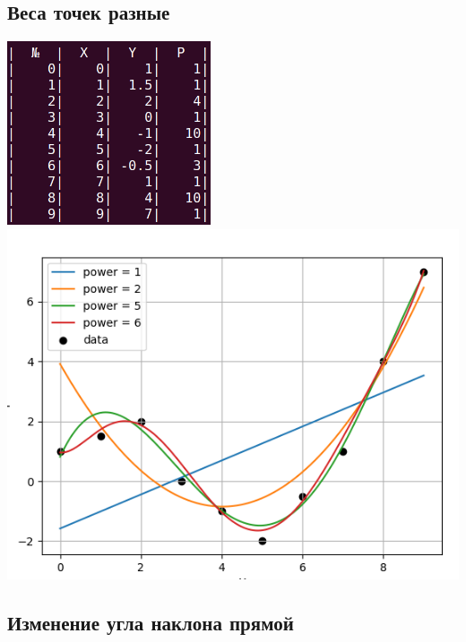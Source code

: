 \documentclass[a4paper,12pt]{article}
\begin{document}
\subsection{Веса точек разные}

\begin{center}
    \includegraphics[width=6cm]{table2.png}
    \includegraphics[scale=0.6]{graph2.png}   
\end{center}

\subsection{Изменение угла наклона прямой}
\end{document}
